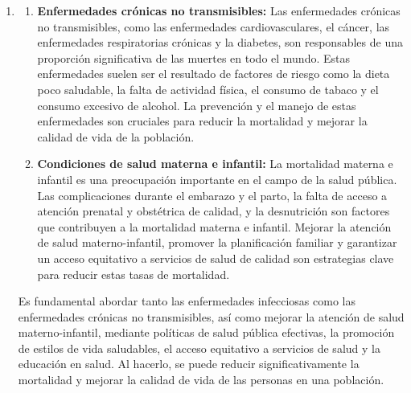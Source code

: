 \documentclass[8pt,a4paper]{beamer}
\begin{document}
{\begin{frame}{}
\begin{block}{}
\begin{enumerate}
\begin{enumerate}
\end{enumerate}
\end{enumerate}
\end{block}
\end{frame}


\begin{frame}{}
\setlength{\parskip}{3px}
\justifying
\begin{block}{}
\setlength{\parskip}{3px}
\justifying
\begin{enumerate}
\setlength{\parskip}{3px}
\justifying
\item[{}] 

\begin{enumerate}
\setlength{\parskip}{3px}
\justifying
\item[\ding{99}] \textbf{Enfermedades crónicas no transmisibles:} Las enfermedades crónicas no transmisibles, como las enfermedades cardiovasculares, el cáncer, las enfermedades respiratorias crónicas y la diabetes, son responsables de una proporción significativa de las muertes en todo el mundo. Estas enfermedades suelen ser el resultado de factores de riesgo como la dieta poco saludable, la falta de actividad física, el consumo de tabaco y el consumo excesivo de alcohol. La prevención y el manejo de estas enfermedades son cruciales para reducir la mortalidad y mejorar la calidad de vida de la población.

\item[\ding{99}] \textbf{Condiciones de salud materna e infantil:} La mortalidad materna e infantil es una preocupación importante en el campo de la salud pública. Las complicaciones durante el embarazo y el parto, la falta de acceso a atención prenatal y obstétrica de calidad, y la desnutrición son factores que contribuyen a la mortalidad materna e infantil. Mejorar la atención de salud materno-infantil, promover la planificación familiar y garantizar un acceso equitativo a servicios de salud de calidad son estrategias clave para reducir estas tasas de mortalidad.
\end{enumerate}
Es fundamental abordar tanto las enfermedades infecciosas como las enfermedades crónicas no transmisibles, así como mejorar la atención de salud materno-infantil, mediante políticas de salud pública efectivas, la promoción de estilos de vida saludables, el acceso equitativo a servicios de salud y la educación en salud. Al hacerlo, se puede reducir significativamente la mortalidad y mejorar la calidad de vida de las personas en una población.
\end{enumerate}
\end{block}
\end{frame}

}
\end{document}
